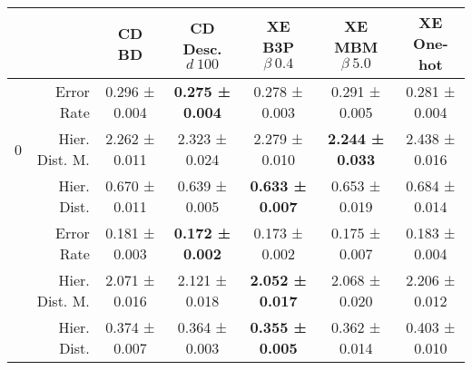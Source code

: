 \begin{tabularx}{\linewidth}{X r *{5}{c}}
\toprule
 &  & CD BD & CD Desc. $d\:100$ & XE B3P $\beta\:0.4$ & XE MBM $\beta\:5.0$ & XE One-hot \\
\midrule
\multirow[c]{3}{*}{0} & Error Rate & {\cellcolor[HTML]{F7FCF5}} \color[HTML]{000000} 0.296 \mdseries ± 0.004 & {\cellcolor[HTML]{75C477}} \color[HTML]{000000} \bfseries 0.275 \mdseries ± 0.004 & {\cellcolor[HTML]{8ACE88}} \color[HTML]{000000} 0.278 \mdseries ± 0.003 & {\cellcolor[HTML]{E4F5DF}} \color[HTML]{000000} 0.291 \mdseries ± 0.005 & {\cellcolor[HTML]{A2D99C}} \color[HTML]{000000} 0.281 \mdseries ± 0.004 \\
 & Hier. Dist. M. & {\cellcolor[HTML]{86CC85}} \color[HTML]{000000} 2.262 \mdseries ± 0.011 & {\cellcolor[HTML]{BAE3B3}} \color[HTML]{000000} 2.323 \mdseries ± 0.024 & {\cellcolor[HTML]{94D390}} \color[HTML]{000000} 2.279 \mdseries ± 0.010 & {\cellcolor[HTML]{75C477}} \color[HTML]{000000} \bfseries 2.244 \mdseries ± 0.033 & {\cellcolor[HTML]{F7FCF5}} \color[HTML]{000000} 2.438 \mdseries ± 0.016 \\
 & Hier. Dist. & {\cellcolor[HTML]{E3F4DE}} \color[HTML]{000000} 0.670 \mdseries ± 0.011 & {\cellcolor[HTML]{8ACE88}} \color[HTML]{000000} 0.639 \mdseries ± 0.005 & {\cellcolor[HTML]{75C477}} \color[HTML]{000000} \bfseries 0.633 \mdseries ± 0.007 & {\cellcolor[HTML]{B6E2AF}} \color[HTML]{000000} 0.653 \mdseries ± 0.019 & {\cellcolor[HTML]{F7FCF5}} \color[HTML]{000000} 0.684 \mdseries ± 0.014 \\
\hhline{-------}
\multirow[c]{3}{*}{1} & Error Rate & {\cellcolor[HTML]{E8F6E4}} \color[HTML]{000000} 0.181 \mdseries ± 0.003 & {\cellcolor[HTML]{75C477}} \color[HTML]{000000} \bfseries 0.172 \mdseries ± 0.002 & {\cellcolor[HTML]{8BCF89}} \color[HTML]{000000} 0.173 \mdseries ± 0.002 & {\cellcolor[HTML]{A9DCA3}} \color[HTML]{000000} 0.175 \mdseries ± 0.007 & {\cellcolor[HTML]{F7FCF5}} \color[HTML]{000000} 0.183 \mdseries ± 0.004 \\
 & Hier. Dist. M. & {\cellcolor[HTML]{8ACE88}} \color[HTML]{000000} 2.071 \mdseries ± 0.016 & {\cellcolor[HTML]{C0E6B9}} \color[HTML]{000000} 2.121 \mdseries ± 0.018 & {\cellcolor[HTML]{75C477}} \color[HTML]{000000} \bfseries 2.052 \mdseries ± 0.017 & {\cellcolor[HTML]{87CD86}} \color[HTML]{000000} 2.068 \mdseries ± 0.020 & {\cellcolor[HTML]{F7FCF5}} \color[HTML]{000000} 2.206 \mdseries ± 0.012 \\
 & Hier. Dist. & {\cellcolor[HTML]{B7E2B1}} \color[HTML]{000000} 0.374 \mdseries ± 0.007 & {\cellcolor[HTML]{95D391}} \color[HTML]{000000} 0.364 \mdseries ± 0.003 & {\cellcolor[HTML]{75C477}} \color[HTML]{000000} \bfseries 0.355 \mdseries ± 0.005 & {\cellcolor[HTML]{8DD08A}} \color[HTML]{000000} 0.362 \mdseries ± 0.014 & {\cellcolor[HTML]{F7FCF5}} \color[HTML]{000000} 0.403 \mdseries ± 0.010 \\

\end{tabularx}
